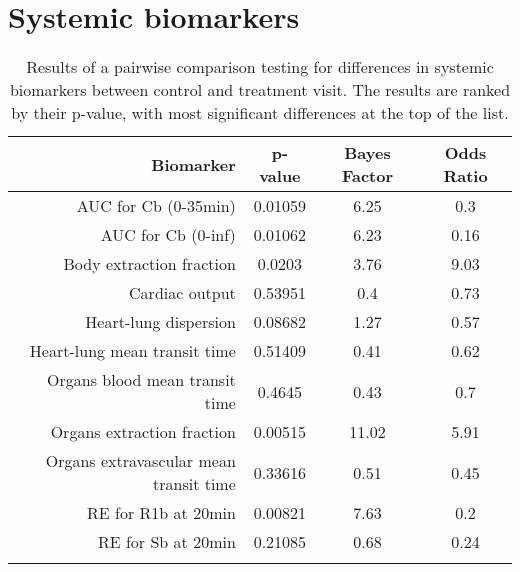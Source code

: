 \documentclass{epflreport}%
\begin{document}
\section{Systemic biomarkers}%
\label{sec:Systemicbiomarkers}%

%
\begin{longtable}{rccc}%
\hline%
Biomarker&p{-}value&Bayes Factor&Odds Ratio\\%
\hline%
AUC for Cb (0{-}35min)&0.01059&6.25&0.3\\%
AUC for Cb (0{-}inf)&0.01062&6.23&0.16\\%
Body extraction fraction&0.0203&3.76&9.03\\%
Cardiac output&0.53951&0.4&0.73\\%
Heart{-}lung dispersion&0.08682&1.27&0.57\\%
Heart{-}lung mean transit time&0.51409&0.41&0.62\\%
Organs blood mean transit time&0.4645&0.43&0.7\\%
Organs extraction fraction&0.00515&11.02&5.91\\%
Organs extravascular mean transit time&0.33616&0.51&0.45\\%
RE for R1b at 20min&0.00821&7.63&0.2\\%
RE for Sb at 20min&0.21085&0.68&0.24\\%
\hline%
\caption{Results of a pairwise comparison testing for differences in systemic biomarkers between control and treatment visit. The results are ranked by their p-value, with most significant differences at the top of the list.} \\%
\end{longtable}%
\end{document}
